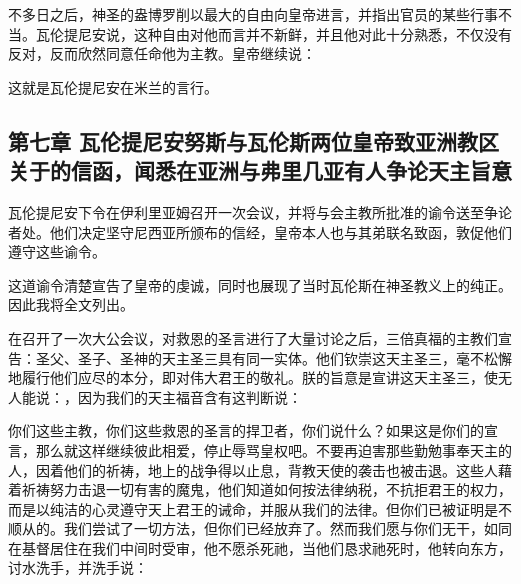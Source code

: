 不多日之后，神圣的盎博罗削以最大的自由向皇帝进言，并指出官员的某些行事不当。瓦伦提尼安说，这种自由对他而言并不新鲜，并且他对此十分熟悉，不仅没有反对，反而欣然同意任命他为主教。皇帝继续说：\par

这就是瓦伦提尼安在米兰的言行。\par


\subsection{第七章 瓦伦提尼安努斯与瓦伦斯两位皇帝致亚洲教区关于的信函，闻悉在亚洲与弗里几亚有人争论天主旨意}

瓦伦提尼安下令在伊利里亚姆召开一次会议，并将与会主教所批准的谕令送至争论者处。他们决定坚守尼西亚所颁布的信经，皇帝本人也与其弟联名致函，敦促他们遵守这些谕令。\par

这道谕令清楚宣告了皇帝的虔诚，同时也展现了当时瓦伦斯在神圣教义上的纯正。因此我将全文列出。\par

在召开了一次大公会议，对救恩的圣言进行了大量讨论之后，三倍真福的主教们宣告：圣父、圣子、圣神的天主圣三具有同一实体。他们钦崇这天主圣三，毫不松懈地履行他们应尽的本分，即对伟大君王的敬礼。朕的旨意是宣讲这天主圣三，使无人能说：，因为我们的天主福音含有这判断说：\par

你们这些主教，你们这些救恩的圣言的捍卫者，你们说什么？如果这是你们的宣言，那么就这样继续彼此相爱，停止辱骂皇权吧。不要再迫害那些勤勉事奉天主的人，因着他们的祈祷，地上的战争得以止息，背教天使的袭击也被击退。这些人藉着祈祷努力击退一切有害的魔鬼，他们知道如何按法律纳税，不抗拒君王的权力，而是以纯洁的心灵遵守天上君王的诫命，并服从我们的法律。但你们已被证明是不顺从的。我们尝试了一切方法，但你们已经放弃了。然而我们愿与你们无干，如同在基督居住在我们中间时受审，他不愿杀死祂，当他们恳求祂死时，他转向东方，讨水洗手，并洗手说：\par

